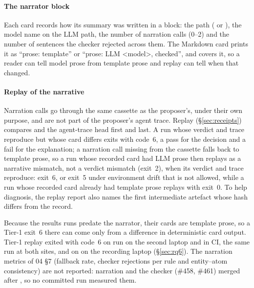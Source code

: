 \paragraph{The narrator block}
Each card records how its summary was written in a  block: the path ( or ), the model name on the LLM path, the number of narration calls (0--2) and the number of sentences the checker rejected across them.
The Markdown card prints it as ``prose: template'' or ``prose: LLM \textless model\textgreater, checked'', and  covers it, so a reader can tell model prose from template prose and replay can tell when that changed.

\paragraph{Replay of the narrative}
Narration calls go through the same cassette as the proposer's, under their own purpose, and are not part of the proposer's agent trace.
Replay (\S\ref{sec:receipts}) compares  and the agent-trace head first and  last.
A run whose verdict and trace reproduce but whose card differs exits with code~6, a pass for the decision and a fail for the explanation; a narration call missing from the cassette falls back to template prose, so a run whose recorded card had LLM prose then replays as a narrative mismatch, not a verdict mismatch (exit~2), when its verdict and trace reproduce: exit~6, or exit~5 under environment drift that is not allowed, while a run whose recorded card already had template prose replays with exit~0.
To help diagnosis, the replay report also names the first intermediate artefact whose hash differs from the record.

Because the results runs predate the narrator, their cards are template prose, so a Tier-1 exit~6 there can come only from a difference in deterministic card output.
Tier-1 replay exited with code~6 on  run on the second laptop and  in CI, the same run at both sites, and on  on the recording laptop (\S\ref{sec:rq6}).
The narration metrics of 04 §7 (fallback rate, checker rejections per rule and entity--atom consistency) are not reported: narration and the checker (\#458, \#461) merged after , so no committed run measured them.
